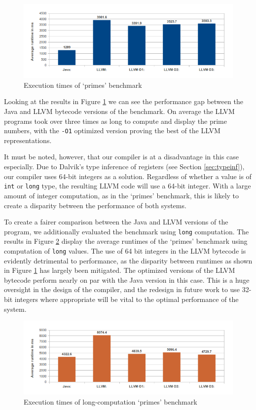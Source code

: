 \begin{figure}[h!]
    \centering
    \includegraphics[width=1.0\textwidth]{images/res_primes.png}
    \caption{Execution times of `primes' benchmark}
    \label{fig:res_primes}
\end{figure}

Looking at the results in Figure \ref{fig:res_primes} we can see the performance gap between the Java and LLVM bytecode versions of the benchmark. On average the LLVM programs took over three times as long to compute and display the prime numbers, with the \verb|-O1| optimized version proving the best of the LLVM representations.

It must be noted, however, that our compiler is at a disadvantage in this case especially. Due to Dalvik's type inference of registers (see Section \ref{sec:typeinf}), our compiler uses 64-bit integers as a solution. Regardless of whether a value is of \verb|int| or \verb|long| type, the resulting LLVM code will use a 64-bit integer. With a large amount of integer computation, as in the `primes' benchmark, this is likely to create a disparity between the performance of both systems.

To create a fairer comparison between the Java and LLVM versions of the program, we additionally evaluated the benchmark using \verb|long| computation. The results in Figure \ref{fig:res_primes_long} display the average runtimes of the `primes' benchmark using computation of \verb|long| values. The use of 64 bit integers in the LLVM bytecode is evidently detrimental to performance, as the disparity between runtimes as shown in Figure \ref{fig:res_primes} has largely been mitigated. The optimized versions of the LLVM bytecode perform nearly on par with the Java version in this case. This is a huge oversight in the design of the compiler, and the redesign in future work to use 32-bit integers where appropriate will be vital to the optimal performance of the system.

\begin{figure}[h!]
    \centering
    \includegraphics[width=1.0\textwidth]{images/res_primes_long.png}
    \caption{Execution times of long-computation `primes' benchmark}
    \label{fig:res_primes_long}
\end{figure}
